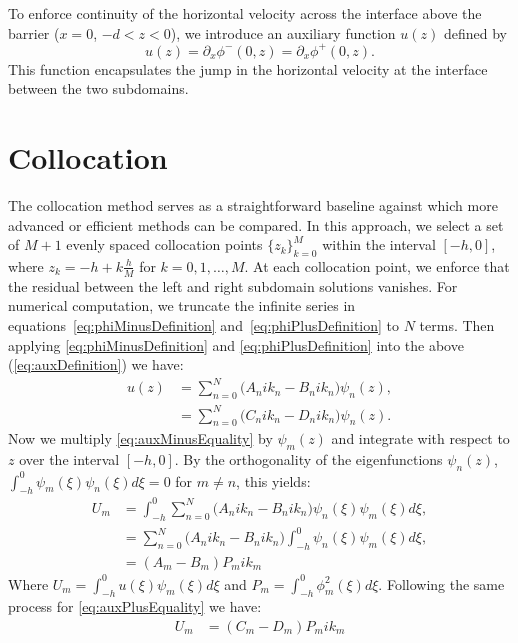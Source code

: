 \documentclass[a4paper,12pt]{report}
\begin{document}
To enforce continuity of the horizontal velocity across the interface above the barrier ($x=0$, $-d < z < 0$), we introduce an auxiliary function $u(z)$ defined by
\begin{equation}
\label{eq:auxDefinition}
u(z) = \partial_x \phi^-(0,z) = \partial_x \phi^+(0,z).
\end{equation}
This function encapsulates the jump in the horizontal velocity at the interface between the two subdomains.
\section{Collocation}
The collocation method serves as a straightforward baseline against which more advanced or efficient methods can be compared. In this approach, we select a set of $M+1$ evenly spaced collocation points $\{z_k\}_{k=0}^{M}$ within the interval $[-h, 0]$, where $z_k = -h + k\frac{h}{M}$ for $k = 0, 1, \ldots, M$. At each collocation point, we enforce that the residual between the left and right subdomain solutions vanishes. For numerical computation, we truncate the infinite series in equations~\eqref{eq:phiMinusDefinition} and~\eqref{eq:phiPlusDefinition} to $N$ terms.
Then applying \ref{eq:phiMinusDefinition} and \ref{eq:phiPlusDefinition} into the above (\ref{eq:auxDefinition}) we have:
\begin{align}
\label{eq:auxMinusEquality}
u(z) &= \sum_{n=0}^{N} \big(A_nik_n - B_nik_n\big)\psi_n(z),\\
\label{eq:auxPlusEquality}
&= \sum_{n=0}^{N} \big(C_nik_n - D_nik_n\big)\psi_n(z).
\end{align}
Now  we multiply \eqref{eq:auxMinusEquality} by $\psi_m(z)$ and integrate with respect to $z$ over the interval $[-h, 0]$. By the orthogonality of the eigenfunctions $\psi_n(z)$, $\int_{-h}^0 \psi_m(\xi)\psi_n(\xi) d\xi = 0$ for $m \neq n$, this yields:
\begin{align}
\label{eq:auxMinusIntegrate}
U_m &= \int_{-h}^{0}\sum_{n=0}^{N} \big(A_nik_n - B_nik_n\big)\psi_n(\xi)\psi_m(\xi)d\xi,\nonumber\\
&= \sum_{n=0}^{N} \big(A_nik_n - B_nik_n\big)\int_{-h}^{0}\psi_n(\xi)\psi_m(\xi)d\xi,\nonumber\\
&= (A_m - B_m)P_mik_m
\end{align}
Where $U_m = \int^0_{-h}u(\xi) \psi_m(\xi) d\xi$ and $P_m = \int^0_{-h}\phi_m^2(\xi) d\xi$. Following the same process for \ref{eq:auxPlusEquality} we have:
\begin{align}
\label{eq:auxPlusIntegrate}
U_m &= (C_m - D_m)P_mik_m
\end{align}
\end{document}
